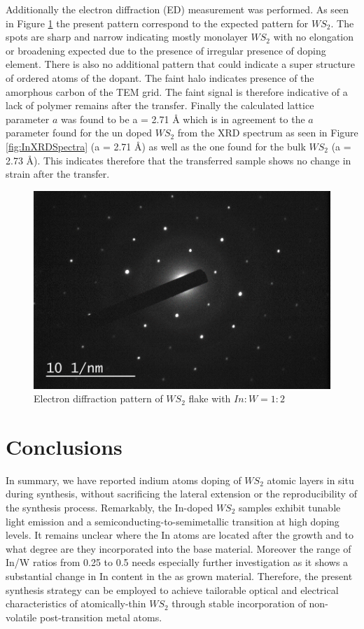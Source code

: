 Additionally the electron diffraction (ED) measurement was performed. As seen in Figure \ref{fig:InTEMED} the present pattern correspond to the expected pattern for $WS_2$. The spots are sharp and narrow indicating mostly monolayer $WS_2$ with no elongation or broadening expected due to the presence of irregular presence of doping element. There is also no additional pattern that could indicate a super structure of ordered atoms of the dopant. The faint halo indicates presence of the amorphous carbon of the TEM grid. The faint signal is therefore indicative of a lack of polymer remains after the transfer. Finally the calculated lattice parameter $a$ was found to be a = 2.71 \r{A} which is in agreement to the $a$ parameter found for the un doped $WS_2$ from the XRD spectrum as seen in Figure \ref{fig:InXRDSpectra} (a = 2.71 \r{A}) as well as the  one found for the bulk $WS_2$ (a = 2.73 \r{A}). This indicates therefore that the transferred sample shows no change in strain after the transfer.

\begin{figure}[H]
	\begin{center}
		\includegraphics[scale=0.4]{In/TEMED.png}
		\caption{Electron diffraction pattern of $WS_2$ flake with $In:W = 1:2$}
		\label{fig:InTEMED}
	\end{center}
\end{figure}

\section{Conclusions}

In summary, we have reported indium atoms doping of $WS_2$ atomic layers in situ during synthesis, without sacrificing the lateral extension or the reproducibility of the synthesis process. Remarkably, the In-doped $WS_2$ samples exhibit tunable light emission and a semiconducting-to-semimetallic transition at high doping levels. It remains unclear where the In atoms are located after the growth and to what degree are they incorporated into the base material. Moreover the range of In/W ratios from 0.25 to 0.5 needs especially further investigation as it shows a substantial change in In content in the as grown material. Therefore, the present synthesis strategy can be employed to achieve tailorable optical and electrical characteristics of atomically-thin $WS_2$ through stable incorporation of non-volatile post-transition metal atoms.